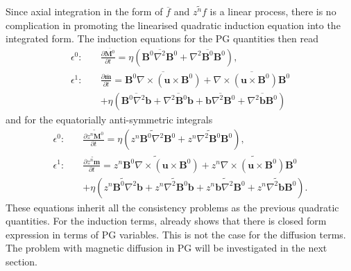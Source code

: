 Since axial integration in the form of $\overline{f}$ and $\widetilde{z^n f}$ is a linear process, there is no complication in promoting the linearised quadratic induction equation into the integrated form. The induction equations for the PG quantities then read
\begin{equation}\label{eqn:induction-pg-lin-sym}
\begin{aligned}
    \epsilon^0:\quad &\frac{\partial \overline{\mathbf{M}^0}}{\partial t} = \eta \left(\overline{\mathbf{B}^0 \nabla^2 \mathbf{B}^0} + \overline{\nabla^2 \mathbf{B}^0 \mathbf{B}^0}\right), \\
    \epsilon^1:\quad &\frac{\partial \overline{\mathbf{m}}}{\partial t} = \overline{\mathbf{B}^0 \nabla\times (\mathbf{u}\times \mathbf{B}^0)} + \overline{\nabla\times (\mathbf{u}\times \mathbf{B}^0) \mathbf{B}^0} \\
    &+ \eta \left(\overline{\mathbf{B}^0 \nabla^2 \mathbf{b}} + \overline{\nabla^2 \mathbf{B}^0 \mathbf{b}} + \overline{\mathbf{b} \nabla^2 \mathbf{B}^0} + \overline{\nabla^2 \mathbf{b} \mathbf{B}^0}\right)
\end{aligned}
\end{equation}
and for the equatorially anti-symmetric integrals
\begin{equation}\label{eqn:induction-pg-lin-asym}
\begin{aligned}
    \epsilon^0:\quad &\frac{\partial \widetilde{z^n \mathbf{M}^0}}{\partial t} = \eta \left(\widetilde{z^n\mathbf{B}^0 \nabla^2 \mathbf{B}^0} + \widetilde{z^n\nabla^2 \mathbf{B}^0 \mathbf{B}^0}\right), \\
    \epsilon^1:\quad &\frac{\partial \widetilde{z^n\mathbf{m}}}{\partial t} = \widetilde{z^n\mathbf{B}^0 \nabla\times (\mathbf{u}\times \mathbf{B}^0)} + \widetilde{z^n\nabla\times (\mathbf{u}\times \mathbf{B}^0) \mathbf{B}^0} \\
    &+ \eta \left(\widetilde{z^n\mathbf{B}^0 \nabla^2 \mathbf{b}} + \widetilde{z^n\nabla^2 \mathbf{B}^0 \mathbf{b}} + \widetilde{z^n\mathbf{b} \nabla^2 \mathbf{B}^0} + \widetilde{z^n\nabla^2 \mathbf{b} \mathbf{B}^0}\right).
\end{aligned}
\end{equation}
These equations inherit all the consistency problems as the previous quadratic quantities.
For the induction terms, \textcite{jackson_plesio-geostrophy_2020} already shows that there is closed form expression in terms of PG variables. This is not the case for the diffusion terms. The problem with magnetic diffusion in PG will be investigated in the next section.    

